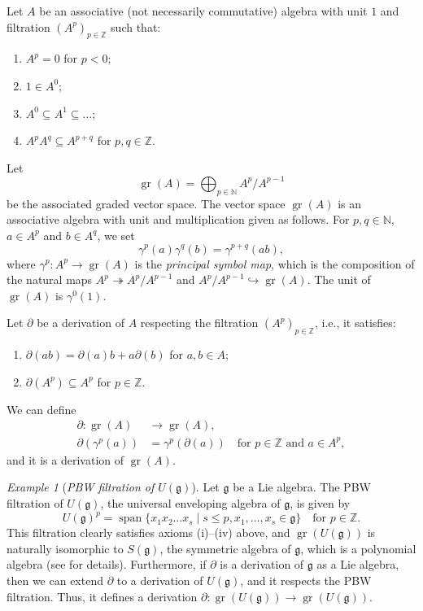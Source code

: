 \documentclass[a4paper, 12pt, reqno]{amsart}
\theoremstyle{remark}
\newtheorem{example}[theorem]{Example}
\DeclareMathOperator{\gr}{gr}
\DeclareMathOperator{\vspan}{span}
\begin{document}
Let $A$ be an associative (not necessarily commutative) algebra with unit $1$ and filtration $(A^p)_{p \in \mathbb{Z}}$ such that:
\begin{enumerate}
\item $A^p = 0$ for $p < 0$;
\item $1 \in A^0$;
\item $A^0 \subseteq A^1 \subseteq \dots$;
\item $A^pA^q \subseteq A^{p + q}$ for $p, q \in \mathbb{Z}$.
\end{enumerate}
Let
\begin{equation*}
  \gr(A) = \bigoplus_{p \in \mathbb{N}}A^p/A^{p - 1}
\end{equation*}
be the associated graded vector space.
The vector space $\gr(A)$ is an associative algebra with unit and multiplication given as follows.
For $p, q \in \mathbb{N}$, $a \in A^p$ and $b \in A^q$, we set
\begin{equation*}
  \gamma^p(a)\gamma^q(b) = \gamma^{p + q}(ab),
\end{equation*}
where $\gamma^p: A^p \to \gr(A)$ is the \emph{principal symbol map}, which is the composition of the natural maps $A^p \twoheadrightarrow A^p/A^{p - 1}$ and $A^p/A^{p - 1} \hookrightarrow \gr(A)$.
The unit of $\gr(A)$ is $\gamma^0(1)$.

Let $\partial$ be a derivation of $A$ respecting the filtration $(A^p)_{p \in \mathbb{Z}}$, i.e., it satisfies:
\begin{enumerate}
\item $\partial(ab) = \partial(a)b + a\partial(b)$ for $a, b \in A$;
\item $\partial(A^p) \subseteq A^p$ for $p \in \mathbb{Z}$.
\end{enumerate}
We can define
\begin{align*}
  \partial: \gr(A) &\to \gr(A), \\
  \partial(\gamma^p(a)) &= \gamma^p(\partial(a)) \quad \text{for $p \in \mathbb{Z}$ and $a \in A^p$},
\end{align*}
and it is a derivation of $\gr(A)$.

\begin{example}[\emph{PBW filtration of $U(\mathfrak{g})$}]
  \label{exa:1}
  Let $\mathfrak{g}$ be a Lie algebra.
  The PBW filtration of $U(\mathfrak{g})$, the universal enveloping algebra of $\mathfrak{g}$, is given by
  \begin{equation*}
    U(\mathfrak{g})^p = \vspan\{x_1x_2\dots x_s \mid s \le p, x_1, \dots, x_s \in \mathfrak{g}\} \quad \text{for $p \in \mathbb{Z}$}.
  \end{equation*}
  This filtration clearly satisfies axioms (i)--(iv) above, and $\gr(U(\mathfrak{g}))$ is naturally isomorphic to $S(\mathfrak{g})$, the symmetric algebra of $\mathfrak{g}$, which is a polynomial algebra (see \cite[\S2]{dixmier_enveloping_1996} for details).
  Furthermore, if $\partial$ is a derivation of $\mathfrak{g}$ as a Lie algebra, then we can extend $\partial$ to a derivation of $U(\mathfrak{g})$, and it respects the PBW filtration.
  Thus, it defines a derivation $\partial: \gr(U(\mathfrak{g})) \to \gr(U(\mathfrak{g}))$.
\end{example}
\end{document}
